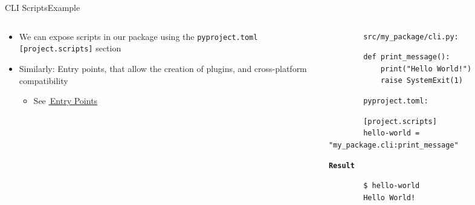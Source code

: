 \begin{splitframe}[fragile]{CLI Scripts}{Example}
  \begin{columns}[t,onlytextwidth]
    \begin{column}{0.58\textwidth}
      \begin{itemize}
        \setlength{\itemsep}{1em}
        \item We can expose scripts in our package using the \texttt{pyproject.toml}
          \texttt{[project.scripts]} section
        \item Similarly: Entry points, that allow the creation of plugins, and cross-platform
          compatibility
          \begin{itemize}
            \item See \href{https://setuptools.pypa.io/en/latest/userguide/entry_point.html}{{\footnotesize{\faExternalLink*}}\,Entry Points}
          \end{itemize}
      \end{itemize}
    \end{column}
    \hfill
    \begin{column}{0.38\textwidth}
      \begin{verbatim}
        src/my_package/cli.py:
      \end{verbatim}
      \vspace{0.25em}
      \begin{verbatim}
        def print_message():
            print("Hello World!")
            raise SystemExit(1)
      \end{verbatim}
      \vspace{1em}
      \begin{verbatim}
        pyproject.toml:
      \end{verbatim}
      \vspace{0.25em}
      \begin{verbatim}
        [project.scripts]
        hello-world = "my_package.cli:print_message"
      \end{verbatim}
      \vspace{1em}
      \begin{center}
        \huge\textcolor{cpink}{\texttt{\textbf{Result}}}
      \end{center}
      \begin{verbatim}
        $ hello-world
        Hello World!
      \end{verbatim}
    \end{column}
  \end{columns}
\end{splitframe}



